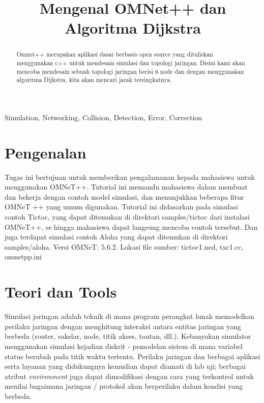 \documentclass[conference]{IEEEtran}
\begin{document}
\title{Mengenal OMNet++ dan Algoritma Dijkstra}

\author{
	\and
}
\maketitle

\begin{abstract}
	Omnet++ merupakan aplikasi dasar berbasis open source yang dituliskan menggunakan c++ untuk mendesain simulasi dan topologi jaringan. Disini kami akan mencoba mendesain sebuah topologi jaringan berisi 6 node dan dengan menggunakan algoritma Dijkstra, kita akan mencari jarak tersingkatnya.

\end{abstract}

\begin{IEEEkeywords}
	Simulation, Networking, Collision, Detection, Error, Correction
\end{IEEEkeywords}

\section{Pengenalan}
Tugas ini bertujuan untuk memberikan pengalamanan kepada mahasiswa untuk menggunakan OMNeT++. Tutorial ini memandu mahasiswa dalam membuat dan bekerja dengan contoh model simulasi,
dan menunjukkan beberapa fitur OMNeT ++ yang umum digunakan. Tutorial ini didasarkan pada
simulasi contoh Tictoc, yang dapat ditemukan di direktori samples/tictoc dari instalasi OMNeT++, sehingga mahasiswa dapat langsung mencoba contoh tersebut. Dan juga terdapat simulasi contoh Aloha yang dapat ditemukan di direktori samples/aloha. Versi OMNeT: 5.6.2. Lokasi file sumber:
tictoc1.ned, txc1.cc, omnetpp.ini

\section{Teori dan Tools}\label{teori-tool}
Simulasi jaringan adalah teknik di mana program perangkat lunak memodelkan perilaku jaringan dengan menghitung interaksi antara entitas jaringan yang berbeda (router, sakelar, node, titik akses, tautan, dll.). Kebanyakan simulator menggunakan simulasi kejadian diskrit - pemodelan sistem di mana variabel status berubah pada titik waktu tertentu. Perilaku jaringan dan berbagai aplikasi serta layanan yang didukungnya kemudian dapat diamati di lab uji; berbagai atribut \textit{environment} juga dapat dimodifikasi dengan cara yang terkontrol untuk menilai bagaimana jaringan / protokol akan berperilaku dalam kondisi yang berbeda.
\end{document}
